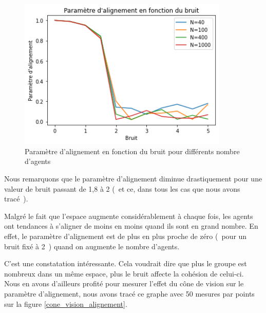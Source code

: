 \documentclass[french, a4paper, 12pt, openany]{report}
\begin{document}
	\begin{figure}[!h]
		\centering
		\includegraphics[width=10cm]{images/comparatif_4.png}
		\caption{Paramètre d'alignement en fonction du bruit pour différents nombre d'agents}
		\label{param_bruit_2}
	\end{figure}
	
	 Nous remarquons que le paramètre d'alignement diminue drastiquement pour une valeur de bruit passant de 1,8 à 2 (~et ce, dans tous les cas que nous avons tracé~). 
	 
	 Malgré le fait que l'espace augmente considérablement à chaque fois, les agents ont tendances à s'aligner de moins en moins quand ils sont en grand nombre. En effet, le paramètre d'alignement est de plus en plus proche de zéro (~pour un bruit fixé à 2~) quand on augmente le nombre d'agents.
	 
	 C'est une constatation intéressante. Cela voudrait dire que plus le groupe est nombreux dans un même espace, plus le bruit affecte la cohésion de celui-ci. \\
	  
	
	Nous en avons d'ailleurs profité pour mesurer l'effet du cône de vision sur le paramètre d'alignement, nous avons tracé ce graphe avec 50 mesures par points sur la figure \ref{cone_vision_alignement}. 
	
\end{document}
